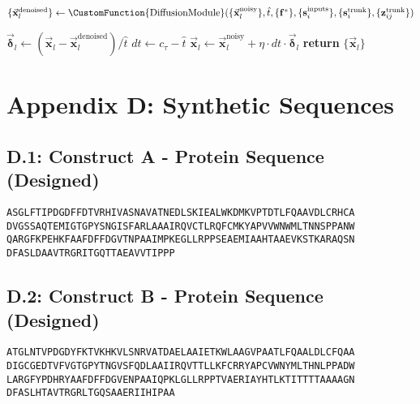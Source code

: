 \begin{suppalgorithm}
{\begin{algorithmic}[1]
            \State $\{\vec{\mathbf{x}}_l^{\text{denoised}}\} \gets \CustomFunction{\text{DiffusionModule}}(\{\vec{\mathbf{x}}_l^{\text{noisy}}\}, \hat{t}, \{\mathbf{f}^*\}, \{\mathbf{s}_i^{\text{inputs}}\}, \{\mathbf{s}_i^{\text{trunk}}\}, \{\mathbf{z}_{ij}^{\text{trunk}}\})$
            
        
            \State $\vec{\boldsymbol{\delta}}_l \gets (\vec{\mathbf{x}}_l - \vec{\mathbf{x}}_l^{\text{denoised}})/\hat{t}$
            \State $dt \gets c_\tau - \hat{t}$
            \State $\vec{\mathbf{x}}_l \gets \vec{\mathbf{x}}_l^{\text{noisy}} + \eta \cdot dt \cdot \vec{\boldsymbol{\delta}}_l$
        \EndFor
        \State \textbf{return} $\{\vec{\mathbf{x}}_l\}$
        \end{algorithmic}
    }
    \label{alg:af3_sym}
\end{suppalgorithm}
\section*{Appendix D: Synthetic Sequences}\label{appendix:synthetic_seqs}
\subsection*{D.1: Construct A - Protein Sequence (Designed)}
\begin{verbatim}
ASGLFTIPDGDFFDTVRHIVASNAVATNEDLSKIEALWKDMKVPTDTLFQAAVDLCRHCA
DVGSSAQTEMIGTGPYSNGISFARLAAAIRQVCTLRQFCMKYAPVVWNWMLTNNSPPANW
QARGFKPEHKFAAFDFFDGVTNPAAIMPKEGLLRPPSEAEMIAAHTAAEVKSTKARAQSN
DFASLDAAVTRGRITGQTTAEAVVTIPPP
\end{verbatim}
\subsection*{D.2: Construct B - Protein Sequence (Designed)}
\begin{verbatim}
ATGLNTVPDGDYFKTVKHKVLSNRVATDAELAAIETKWLAAGVPAATLFQAALDLCFQAA
DIGCGEDTVFVGTGPYTNGVSFQDLAAIIRQVTTLLKFCRRYAPCVWNYMLTHNLPPADW
LARGFYPDHRYAAFDFFDGVENPAAIQPKLGLLRPPTVAERIAYHTLKTITTTTAAAAGN
DFASLHTAVTRGRLTGQSAAERIIHIPAA
\end{verbatim}
